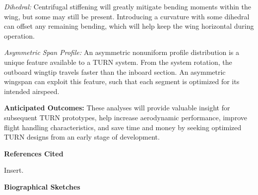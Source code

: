 \documentclass[11pt]{article}
\begin{document}
\emph{Dihedral:}
Centrifugal stiffening will greatly mitigate bending moments within the wing, but some may still be present.  Introducing a curvature with some dihedral can offset any remaining bending, which will help keep the wing horizontal during operation.

\emph{Asymmetric Span Profile:}
An asymmetric nonuniform profile distribution is a unique feature available to a TURN system.  From the system rotation, the outboard wingtip travels faster than the inboard section.  An asymmetric wingspan can exploit this feature, such that each segment is optimized for its intended airspeed.


{\bf Anticipated Outcomes:}
These analyses will provide valuable insight for subsequent TURN prototypes, help increase aerodynamic performance, improve flight handling characteristics, and save time and money by seeking optimized TURN designs from an early stage of development.








\newpage \cfoot{ }
{\color{red} \bf \Huge References Cited}

Insert.








\newpage
{\bf \Huge Biographical Sketches}
\end{document}
